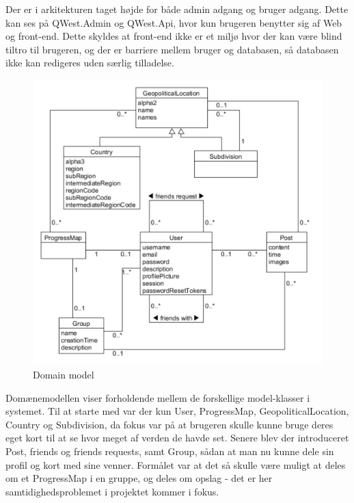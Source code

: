 Der er i arkitekturen taget højde for både admin adgang og bruger adgang. Dette kan ses på QWest.Admin og QWest.Api, hvor kun brugeren benytter sig af Web og front-end. Dette skyldes at front-end ikke er et miljø hvor der kan være blind tiltro til brugeren, og der er barriere mellem bruger og databasen, så databasen ikke kan redigeres uden særlig tilladelse. 

\begin{figure}
    \includegraphics[width=\linewidth]{figures/Domain.png}
    \caption{Domain model}
    \label{fig:Domain}
\end{figure}

Domænemodellen viser forholdende mellem de forskellige model-klasser i systemet. Til at starte med var der kun User, ProgressMap, GeopoliticalLocation, Country og Subdivision, da fokus var på at brugeren skulle kunne bruge deres eget kort til at se hvor meget af verden de havde set. Senere blev der introduceret Post, friends og friends requests, samt Group, sådan at man nu kunne dele sin profil og kort med sine venner. 
Formålet var at det så skulle være muligt at deles om et ProgressMap i en gruppe, og deles om opslag - det er her samtidighedsproblemet i projektet kommer i fokus.

